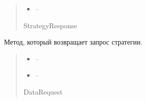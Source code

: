 \documentclass[letterpaper,10pt,english,openany,oneside]{sphinxmanual}
\begin{document}
\begin{fulllineitems}
\begin{fulllineitems}
\begin{quote}
\begin{description}
\begin{itemize}
\item {} 
\sphinxAtStartPar
{} – 

\end{itemize}

\sphinxAtStartPar
StrategyResponse

\sphinxAtStartPar
{\hyperref[\detokenize{src.structures:src.structures.st_strategies.StrategyResponse}]{}}

\end{description}\end{quote}

\end{fulllineitems}


\begin{fulllineitems}
\label{\detokenize{src.structures:src.structures.st_strategies.BaseStrategy.get_request}}
\pysigstartsignatures
{}
\pysigstopsignatures
\sphinxAtStartPar
Метод, который возвращает запрос стратегии.
\begin{quote}\begin{description}
\begin{itemize}
\item {} 
\sphinxAtStartPar
{} – 

\item {} 
\sphinxAtStartPar
{} – 

\end{itemize}

\sphinxAtStartPar
DataRequest

\sphinxAtStartPar
{\hyperref[\detokenize{src.structures:src.structures.st_strategies.DataRequest}]{}}

\end{description}\end{quote}

\end{fulllineitems}


\end{fulllineitems}
\end{document}
